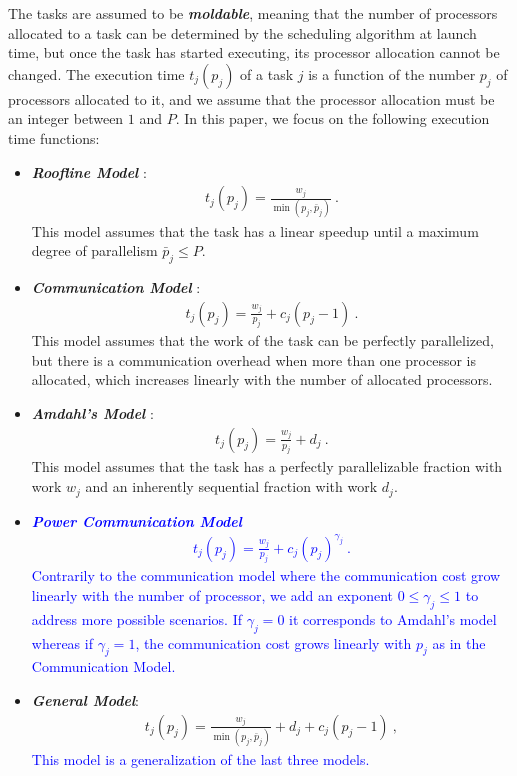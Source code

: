 \documentclass{article}
\newcommand{\new}[1]{\textcolor{blue}{#1}}
\begin{document}
The tasks are assumed to be \textbf{\emph{moldable}}, meaning that the number of processors allocated to a task can be determined by the scheduling algorithm at launch time, but once the task has started executing, its processor allocation cannot be changed. The execution time $t_j(p_j)$ of a task $j$ is a function of the number $p_j$ of processors allocated to it, and we assume that the processor allocation must be an integer between $1$ and $P$. In this paper, we focus on the following execution time functions:
\begin{itemize}
\item \emph{\textbf{Roofline Model}} \cite{Williams2009}:
\begin{align}
\label{eq.model.roof}
t_j(p_j) = \frac{w_j}{\min(p_j, \bar{p}_j)} \ .
\end{align}
This model assumes that the task has a linear speedup until a maximum degree of parallelism $\bar{p}_j \le P$.
\item \emph{\textbf{Communication Model}} \cite{Havill08_SET}:
\begin{align}
\label{eq.model.comm}
t_j(p_j) = \frac{w_j}{p_j} + c_j (p_j - 1) \ .
\end{align}
This model assumes that the work of the task can be perfectly parallelized, but there is a communication overhead when more than one processor is allocated, which increases linearly with the number of allocated processors.


\item \emph{\textbf{Amdahl's Model}} \cite{Amdahl67}:
\begin{align}
\label{eq.model.amdahl}
t_j(p_j) = \frac{w_j}{p_j} + d_j \ .
\end{align}
This model assumes that the task has a perfectly parallelizable fraction with work $w_j$ and an inherently sequential fraction with work $d_j$.


\item \new{\emph{\textbf{Power Communication Model}}
\begin{align}
\label{eq.model.powcomm}
t_j(p_j) = \frac{w_j}{p_j} + c_j (p_j)^{\gamma_j} \ .
\end{align}
Contrarily to the communication model where the communication cost grow linearly with the number of processor, we add an exponent $0 \leq \gamma_j \leq 1$ to address more possible scenarios. If $\gamma_j=0$ it corresponds to Amdahl's model whereas if $\gamma_j=1$, the communication cost grows linearly with $p_j$ as in the Communication Model.}

\item \emph{\textbf{General Model}}:
\begin{align}
\label{eq.exec_time}
t_j(p_j) = \frac{w_j}{\min(p_j, \bar{p}_j)} + d_j + c_j (p_j - 1) \ ,
\end{align}
\new{This model is a generalization of the last three models.}
\end{itemize}
\end{document}
